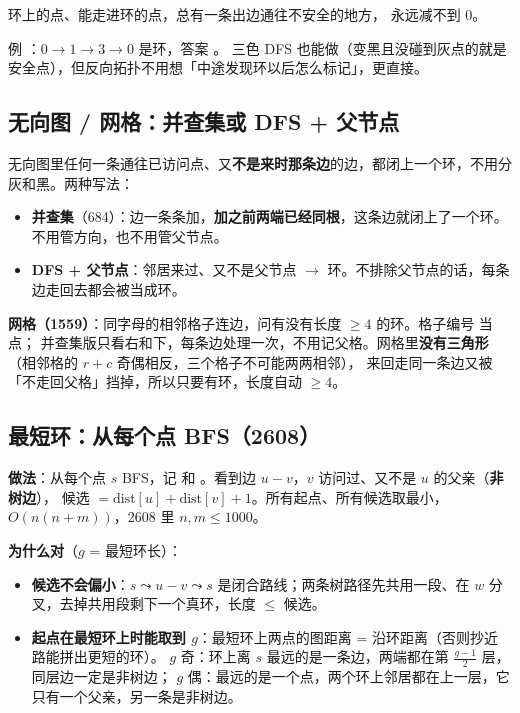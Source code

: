 环上的点、能走进环的点，总有一条出边通往不安全的地方， 永远减不到 0。

例 ：$0 \to 1 \to 3 \to 0$ 是环，答案 \code{[2,4,5,6]}。
三色 DFS 也能做（变黑且没碰到灰点的就是安全点），但反向拓扑不用想「中途发现环以后怎么标记」，更直接。

\subsection{无向图 / 网格：并查集或 DFS + 父节点}

无向图里任何一条通往已访问点、又\textbf{不是来时那条边}的边，都闭上一个环，不用分灰和黑。两种写法：

\begin{itemize}
\item \textbf{并查集}（684）：边一条条加，\textbf{加之前两端已经同根}，这条边就闭上了一个环。不用管方向，也不用管父节点。
\item \textbf{DFS + 父节点}：邻居来过、又不是父节点 $\to$ 环。不排除父节点的话，每条边走回去都会被当成环。
\end{itemize}

\textbf{网格（1559）}：同字母的相邻格子连边，问有没有长度 $\ge 4$ 的环。格子编号  当点；
并查集版只看右和下，每条边处理一次，不用记父格。网格里\textbf{没有三角形}（相邻格的 $r+c$ 奇偶相反，三个格子不可能两两相邻），
来回走同一条边又被「不走回父格」挡掉，所以只要有环，长度自动 $\ge 4$。

\subsection{最短环：从每个点 BFS（2608）}

\textbf{做法}：从每个点 $s$ BFS，记  和 。看到边 $u - v$，$v$ 访问过、又不是 $u$ 的父亲（\textbf{非树边}），
候选 $= \text{dist}[u] + \text{dist}[v] + 1$。所有起点、所有候选取最小，$O(n(n+m))$，2608 里 $n, m \le 1000$。

\textbf{为什么对}（$g$ = 最短环长）：
\begin{itemize}
\item \textbf{候选不会偏小}：$s \leadsto u - v \leadsto s$ 是闭合路线；两条树路径先共用一段、在 $w$ 分叉，去掉共用段剩下一个真环，长度 $\le$ 候选。
\item \textbf{起点在最短环上时能取到 $g$}：最短环上两点的图距离 = 沿环距离（否则抄近路能拼出更短的环）。
$g$ 奇：环上离 $s$ 最远的是一条边，两端都在第 $\frac{g-1}{2}$ 层，同层边一定是非树边；
$g$ 偶：最远的是一个点，两个环上邻居都在上一层，它只有一个父亲，另一条是非树边。
\end{itemize}

